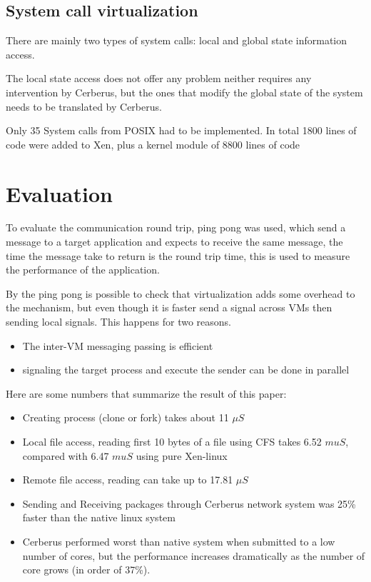\documentclass[journal]{IEEEtran}
\begin{document}
\begin{itemize}
	\subsection{System call virtualization}

	There are mainly two types of system calls: local and global state information access.
	
	The local state access does not offer any problem neither requires any intervention by Cerberus, but the ones that modify the global state of the system needs to be translated by Cerberus.
	
	Only 35 System calls from POSIX had to be implemented. In total 1800 lines of code were added to Xen, plus a kernel module of 8800 lines of code %
	
	\section{Evaluation}
	
	To evaluate the communication round trip, ping pong was used, which send a message to a target application and expects to receive the same message, the time the message take to return is the round trip time, this is used to measure the performance of the application.
	
	By the ping pong is possible to check that virtualization adds some overhead to the mechanism, but even though it is faster send a signal across VMs then sending local signals. This happens for two reasons.
	\begin{itemize}
	\item The inter-VM messaging passing is efficient
	\item signaling the target process and execute the sender can be done in parallel
	\end{itemize}
	
	Here are some numbers that summarize the result of this paper:
	\begin{itemize}
	\item Creating process (clone or fork) takes about 11 $\mu S$ %
	\item Local file access, reading first 10 bytes of a file using CFS takes 6.52 $mu S$, compared with 6.47 $mu S$ using pure Xen-linux
	\item Remote file access, reading can take up to 17.81 $\mu S$
	\item Sending and Receiving packages through Cerberus network system was 25\% faster than the native linux system
	\item Cerberus performed worst than native system when submitted to a low number of cores, but the performance increases dramatically as the number of core grows (in order of 37\%).
	\end{itemize}

\end{itemize}
\end{document}
